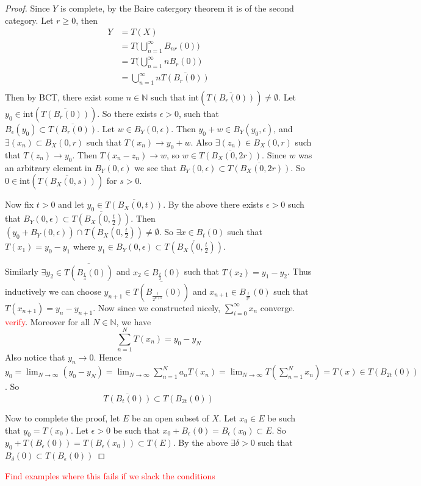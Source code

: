 \begin{proof}
  Since $Y$ is complete, by the Baire catergory theorem it is of the second category. Let $r \ge 0$, then \begin{align*}Y &= T(X)  \\
    &= T\Big(\bigcup_{n = 1}^{\infty}B_{nr}(0)\Big) \\ 
    &= T\Big(\bigcup_{n = 1}^{\infty} n B_r(0)\Big) \\ 
    &= \bigcup_{n = 1}^{\infty} n \overline{T(B_r(0))} \\
\end{align*}
  Then by BCT, there exist some $ n \in \mathbb{N}$ such that $\textrm{int}(\overline{T(B_r(0))}) \neq \emptyset$. Let $y_0 \in \textrm{int}(\overline{T(B_r(0))})$. So there exists $\epsilon > 0$, such that $B_\epsilon(y_0) \subset \overline{T(B_r(0))}$. Let $w \in B_Y(0, \epsilon)$. Then $y_0 + w \in B_Y(y_0, \epsilon)$, and $\exists (x_n) \subset B_X(0, r)$ such that $T(x_n) \to y_0 + w$. Also $\exists(z_n) \in B_X(0, r)$ such that $T(z_n) \to y_0$. Then $T(x_n - z_n) \to w$, so $w \in \overline{T(B_{X}(0, 2r))}$. Since $w$ was an arbitrary element in $B_{Y}(0, \epsilon)$ we see that $B_Y(0, \epsilon) \subset \overline{T(B_X(0, 2r))}$. So $0 \in \textrm{int}(\overline{T(B_X(0, s))})$ for $s > 0$.

  Now fix $t > 0$ and let $y_0 \in \overline{T(B_X(0, t))}$. By the above there exists $\epsilon > 0$ such that $B_Y(0, \epsilon) \subset \overline{T(B_X(0, {\frac{t}{2}}))}$. Then $(y_0 + B_Y(0, \epsilon)) \cap T(B_X(0, {\frac{t}{2}}))  \neq \emptyset$. So $\exists x \in B_t(0)$ such that $T(x_1) = y_0 - y_1$ where $y_1 \in B_Y(0, \epsilon) \subset \overline{T(B_X(0, {\frac{t}{2}}))}$.

  Similarly $\exists y_2 \in \overline{T(B_{\frac{t}{4}}(0))}$ and $x_2 \in B_{\frac{t}{2}}(0)$ such that $T(x_2) = y_1 - y_2$. Thus inductively we can choose $y_{n+1} \in \overline{T(B_{\frac{t}{2^{n+1}}}(0))}$ and $x_{n+1} \in B_{\frac{t}{2^n}}(0)$ such that $T(x_{n+1}) = y_n - y_{n+1}$. Now since we constructed nicely, $\sum_{i = 0}^{\infty}  x_n$ converge. \textcolor{red}{verify}. 
  Moreover for all $N \in \mathbb{N}$, we have \[
    \sum_{n = 1}^{N} T(x_n) = y_0 - y_N
  \]
  Also notice that $y_n \to 0$. Hence $y_0 = \lim_{N \to \infty} (y_0 - y_N) = \lim_{N \to \infty} \sum_{n = 1}^{N} a_n T(x_n) = \lim_{N \to \infty} T( \sum_{n = 1}^{N} x_n) = T(x) \in T( B_{2t}(0))$. So \[
    \overline{T(B_t(0))} \subset T(B_{2t}(0))
  \]

  Now to complete the proof, let $E$ be an open subset of $X$. Let $x_0 \in E$ be such that $y_0 = T(x_0)$. Let $\epsilon > 0$ be such that $ x_0 + B_\epsilon(0) = B_\epsilon(x_0) \subset E$. So $y_0 + T(B_\epsilon(0)) = T(B_\epsilon(x_0)) \subset T(E)$. By the above $\exists \delta > 0$ such that $ B_\delta(0) \subset T(B_\epsilon(0))$
\end{proof}
\textcolor{red}{Find examples where this fails if we slack the conditions}


